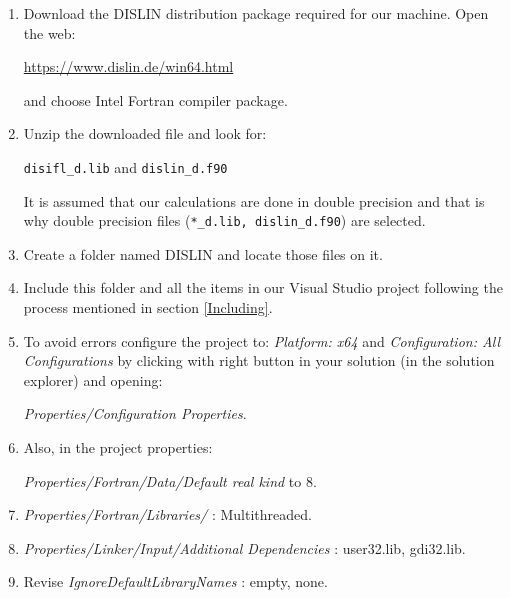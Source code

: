 \begin{enumerate}
     \setlength\itemsep{0.0cm}
    \item Download the DISLIN distribution package required for our machine. Open the web:
    
    \url{https://www.dislin.de/win64.html} 
    
    and choose Intel Fortran compiler package. 
    
    \item  Unzip the downloaded file and look for: 
    
    \texttt{disifl\_d.lib} and \texttt{dislin\_d.f90}
     
    It is assumed that our calculations are done in double precision and that is why double precision files (\texttt{*\_d.lib, dislin\_d.f90}) are selected. 
     
    \item Create a folder named DISLIN and locate those files on it. 
    
    \item Include this folder and all the items in our Visual Studio project following the process mentioned in section \ref{Including}.
    
    \item To avoid errors configure the project to: \textit{Platform: x64} and \textit{Configuration: All Configurations} by clicking with right button in your solution (in the solution explorer) and opening:
    
        \textit{Properties/Configuration Properties}. 
        
    \item Also, in the project properties: 
    
    \textit{Properties/Fortran/Data/Default real kind} to 8. 
    
    \item \textit{Properties/Fortran/Libraries/} : Multithreaded.
     
    \item \textit{Properties/Linker/Input/Additional Dependencies} : user32.lib, gdi32.lib. 
        
    \item Revise \textit{IgnoreDefaultLibraryNames} : empty, none.  
    
\end{enumerate}     
    
%    
%    
%    
 


